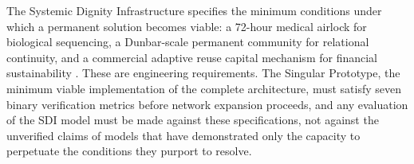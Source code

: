 \documentclass[12pt, letterpaper]{article}
\begin{document}
The Systemic Dignity Infrastructure specifies the minimum conditions under which a permanent solution becomes viable: a 72-hour medical airlock for biological sequencing, a Dunbar-scale permanent community for relational continuity, and a commercial adaptive reuse capital mechanism for financial sustainability \citep{dibella_wp1_2026}. These are engineering requirements. The Singular Prototype, the minimum viable implementation of the complete architecture, must satisfy seven binary verification metrics before network expansion proceeds, and any evaluation of the SDI model must be made against these specifications, not against the unverified claims of models that have demonstrated only the capacity to perpetuate the conditions they purport to resolve.

\newpage


\end{document}

